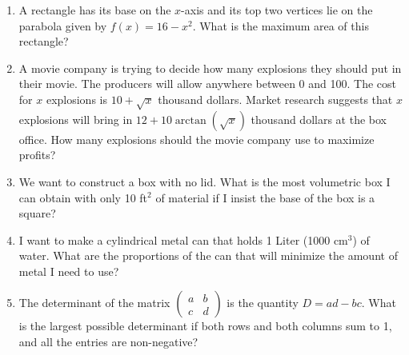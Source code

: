 \documentclass{article}
\newcommand{\R}{\mathbb{R}}
\begin{document}
\begin{enumerate}
\item A rectangle has its base on the $x$-axis and its top two vertices lie on the parabola given by $f(x)=16-x^2$. What is the maximum area of this rectangle?
\item A movie company is trying to decide how many explosions they should put in their movie. The producers will allow anywhere between 0 and 100. The cost for $x$ explosions is $10+\sqrt{x}$ thousand dollars. Market research suggests that $x$ explosions will bring in $12+10\arctan(\sqrt{x})$ thousand dollars at the box office. How many explosions should the movie company use to maximize profits?
\item We want to construct a box with no lid. What is the most volumetric box I can obtain with only 10 ft$^2$ of material if I insist the base of the box is a square?
\item I want to make a cylindrical metal can that holds 1 Liter (1000 cm$^3$) of water. What are the proportions of the can that will minimize the amount of metal I need to use?
\item The determinant of the matrix $\begin{pmatrix}a & b \\ c & d\end{pmatrix}$ is the quantity $D=ad-bc$. What is the largest possible determinant if both rows and both columns sum to 1, and all the entries are non-negative?
\end{enumerate}






\newpage




\end{document}
